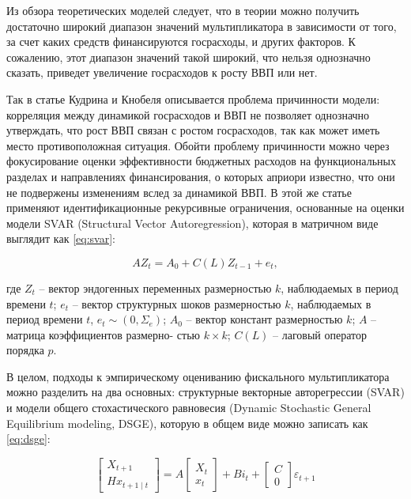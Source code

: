 \documentclass[12pt, a4paper]{extarticle}
\begin{document}
\par
    Из обзора теоретических моделей \cite{ramey} следует, что в теории можно получить достаточно широкий диапазон значений мультипликатора в зависимости от того, за счет каких средств финансируются госрасходы, и других факторов. К сожалению, этот диапазон значений такой широкий, что нельзя однозначно сказать, приведет увеличение госрасходов к росту ВВП или нет.

\par
    Так в статье Кудрина и Кнобеля \cite{kudrin} описывается проблема причинности модели: корреляция между динамикой госрасходов и ВВП не позволяет однозначно утверждать, что рост ВВП связан с ростом госрасходов, так как может иметь место противоположная ситуация. Обойти проблему причинности можно через фокусирование оценки эффективности бюджетных расходов на функциональных разделах и направлениях финансирования, о которых априори известно, что они не подвержены изменениям вслед за динамикой ВВП. В этой же статье \cite{kudrin} применяют идентификационные рекурсивные ограничения, основанные на оценки модели SVAR (Structural Vector Autoregression), которая в матричном виде выглядит как \ref{eq:svar}:
    
\begin{equation}
    A Z_{t}=A_{0}+C(L) Z_{t-1}+e_{t},
    \label{eq:svar}
\end{equation}
    
где $Z_{t}$ – вектор эндогенных переменных размерностью $k$, наблюдаемых в период времени $t$; $e_{t}$ – вектор структурных шоков размерностью $k$, наблюдаемых в период времени $t$, $e_{t} \sim\left(0, \Sigma_{e}\right)$; $A_{0}$ – вектор констант размерностью $k$; $A$ – матрица коэффициентов размерно- стью $k \times k$; $C(L)$ – лаговый оператор порядка $p$.

\par
    В целом, подходы к эмпирическому оцениванию фискального мультипликатора можно разделить на два основных: структурные векторные авторегрессии (SVAR) и модели общего стохастического равновесия (Dynamic Stochastic General Equilibrium modeling, DSGE), которую в общем виде можно записать как \ref{eq:dsge}:
    
\begin{equation}
    \left[\begin{array}{c}
    X_{t+1} \\
    H x_{t+1 \mid t}
    \end{array}\right]=A\left[\begin{array}{c}
    X_{t} \\
    x_{t}
    \end{array}\right]+B i_{t}+\left[\begin{array}{c}
    C \\
    0
    \end{array}\right] \varepsilon_{t+1}
    \label{eq:dsge}
\end{equation}
\end{document}
